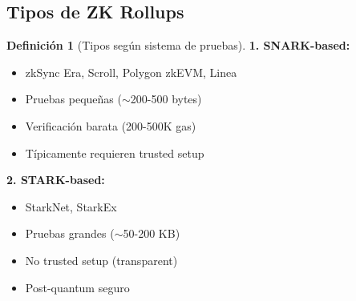 \documentclass[11pt,a4paper,twoside,openright]{book}
\theoremstyle{definition}
\newtheorem{definition}{Definición}[chapter]
\theoremstyle{plain}
\theoremstyle{remark}
\begin{document}
\subsection{Tipos de ZK Rollups}

\begin{definition}[Tipos según sistema de pruebas]
\textbf{1. SNARK-based:}
\begin{itemize}
    \item zkSync Era, Scroll, Polygon zkEVM, Linea
    \item Pruebas pequeñas ($\sim$200-500 bytes)
    \item Verificación barata (200-500K gas)
    \item Típicamente requieren trusted setup
\end{itemize}

\textbf{2. STARK-based:}
\begin{itemize}
    \item StarkNet, StarkEx
    \item Pruebas grandes ($\sim$50-200 KB)
    \item No trusted setup (transparent)
    \item Post-quantum seguro
\end{itemize}
\end{definition}
\end{document}
